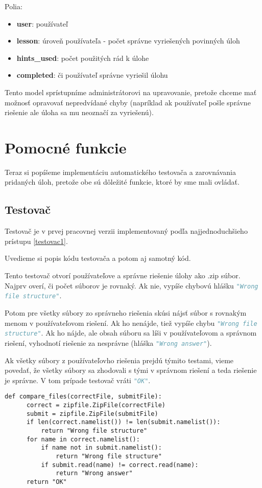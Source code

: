 Polia:
\begin{itemize}
\item \textbf{user}: používateľ
\item \textbf{lesson}: úroveň používateľa - počet správne vyriešených povinných úloh
\item \textbf{hints\_used}: počet použitých rád k úlohe
\item \textbf{completed}: či používateľ správne vyriešil úlohu
\end{itemize}

Tento model sprístupníme administrátorovi na upravovanie, pretože chceme mať možnosť
opravovať nepredvídané chyby (napríklad ak používateľ pošle správne riešenie ale
úloha sa mu neoznačí za vyriešenú).

\protect\section{Pomocné funkcie}
Teraz si popíšeme implementáciu automatického testovača a zarovnávania pridaných úloh, pretože obe sú dôležité
funkcie, ktoré by sme mali ovládať.
\subsection{Testovač}
\label{impl:testovac}
Testovač je v prvej pracovnej verzii implementovaný podľa najjednoduchšieho prístupu \ref{testovac1}.

Uvedieme si popis kódu testovača a potom aj samotný kód.

Tento testovač otvorí používateľove a správne riešenie úlohy ako .zip súbor.
Najprv overí, či počet súborov je rovnaký. Ak nie, vypíše chybovú hlášku \newline\lstinline[language=Python]{"Wrong file structure"}.

Potom pre všetky súbory zo správneho riešenia skúsi nájsť súbor s rovnakým menom
v používateľovom riešení. Ak ho nenájde, tiež vypíše chybu \lstinline[language=Python]{"Wrong file structure"}.
Ak ho nájde, ale obsah súboru sa líši v
používateľovom a správnom riešení, vyhodnotí riešenie za nesprávne (hláška \lstinline[language=Python]{"Wrong answer"}).

Ak všetky súbory z používateľovho riešenia prejdú týmito testami, vieme povedať,
že všetky súbory sa zhodovali s tými v správnom riešení a teda riešenie je správne.
V tom prípade testovač vráti \lstinline[language=Python]{"OK"}.
\begin{lstlisting}[title = testovač]
  def compare_files(correctFile, submitFile):
      correct = zipfile.ZipFile(correctFile)
      submit = zipfile.ZipFile(submitFile)
      if len(correct.namelist()) != len(submit.namelist()):
          return "Wrong file structure"
      for name in correct.namelist():
          if name not in submit.namelist():
              return "Wrong file structure"
          if submit.read(name) != correct.read(name):
              return "Wrong answer"
      return "OK"
\end{lstlisting}

